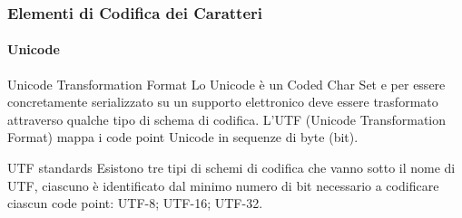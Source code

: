 \begin{frame}
	\frametitle{Elementi di Codifica dei Caratteri}
	\framesubtitle{Unicode}
	\addtocounter{nframe}{1}

	\begin{block}{Unicode Transformation Format}
		Lo Unicode è un Coded Char Set e per essere concretamente serializzato su un supporto elettronico deve essere trasformato attraverso qualche tipo di schema di codifica.
		L'UTF (Unicode Transformation Format) mappa i code point Unicode in sequenze di byte (bit).
	\end{block}

	\begin{block}{UTF standards}
		Esistono tre tipi di schemi di codifica che vanno sotto il nome di UTF, ciascuno è identificato dal minimo numero di bit necessario a codificare ciascun code point: UTF-8; UTF-16; UTF-32. 
	\end{block}

\end{frame}

